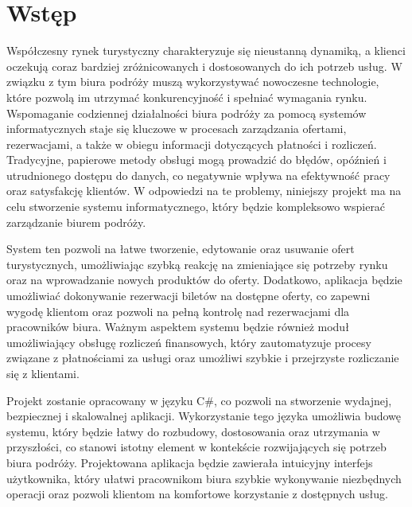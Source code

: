 ﻿\chapter*{Wstęp}

Współczesny rynek turystyczny charakteryzuje się nieustanną dynamiką, a klienci oczekują coraz bardziej zróżnicowanych i dostosowanych do ich potrzeb usług. W związku z tym biura podróży muszą wykorzystywać nowoczesne technologie, które pozwolą im utrzymać konkurencyjność i spełniać wymagania rynku. Wspomaganie codziennej działalności biura podróży za pomocą systemów informatycznych staje się kluczowe w procesach zarządzania ofertami, rezerwacjami, a także w obiegu informacji dotyczących płatności i rozliczeń. Tradycyjne, papierowe metody obsługi mogą prowadzić do błędów, opóźnień i utrudnionego dostępu do danych, co negatywnie wpływa na efektywność pracy oraz satysfakcję klientów. W odpowiedzi na te problemy, niniejszy projekt ma na celu stworzenie systemu informatycznego, który będzie kompleksowo wspierać zarządzanie biurem podróży.

System ten pozwoli na łatwe tworzenie, edytowanie oraz usuwanie ofert turystycznych, umożliwiając szybką reakcję na zmieniające się potrzeby rynku oraz na wprowadzanie nowych produktów do oferty. Dodatkowo, aplikacja będzie umożliwiać dokonywanie rezerwacji biletów na dostępne oferty, co zapewni wygodę klientom oraz pozwoli na pełną kontrolę nad rezerwacjami dla pracowników biura. Ważnym aspektem systemu będzie również moduł umożliwiający obsługę rozliczeń finansowych, który zautomatyzuje procesy związane z płatnościami za usługi oraz umożliwi szybkie i przejrzyste rozliczanie się z klientami.

Projekt zostanie opracowany w języku C\#, co pozwoli na stworzenie wydajnej, bezpiecznej i skalowalnej aplikacji. Wykorzystanie tego języka umożliwia budowę systemu, który będzie łatwy do rozbudowy, dostosowania oraz utrzymania w przyszłości, co stanowi istotny element w kontekście rozwijających się potrzeb biura podróży. Projektowana aplikacja będzie zawierała intuicyjny interfejs użytkownika, który ułatwi pracownikom biura szybkie wykonywanie niezbędnych operacji oraz pozwoli klientom na komfortowe korzystanie z dostępnych usług.

